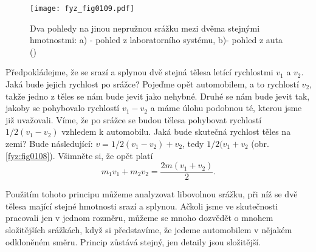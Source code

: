     \begin{figure}[ht!]  %
      \centering
      \texttt{[image: fyz\_fig0109.pdf]}
      \caption{Dva pohledy na jinou nepružnou srážku mezi dvěma stejnými hmotnostmi: a) - pohled z 
               laboratorního systému, b)- pohled z auta
              (\cite[s.~145]{Feynman01})}
      \label{fyz:fig0109}
    \end{figure}
    Předpokládejme, že se srazí a splynou dvě stejná tělesa letící rychlostmi \(v_1\) a \(v_2\). 
    Jaká bude jejich rychlost po srážce? Pojeďme opět automobilem, a to rychlostí \(v_2\), takže 
    jedno z těles se nám bude jevit jako nehybné. Druhé se nám bude jevit tak, jakoby se pohybovalo 
    rychlostí \(v_1 - v_2\) a máme úlohu podobnou té, kterou jsme již uvažovali. Víme, že po srážce 
    se budou tělesa pohybovat rychlostí \(1/2 (v_1 - v_2)\) vzhledem k automobilu. Jaká bude 
    skutečná rychlost těles na zemi? Bude následující: \(v= 1/2(v_1-v_2) + v_2\), tedy \(1/2 (v_1 
    +v_2\) (obr. \ref{fyz:fig0108}). Všimněte si, že opět platí
     \begin{equation}\label{fyz:eq141}
      m_1v_1 + m_2v_2 = \frac{2m(v_1 + v_2)}{2}.
    \end{equation}
    
    Použitím tohoto principu můžeme analyzovat libovolnou srážku, při níž se dvě tělesa mající 
    stejné hmotnosti srazí a splynou. Ačkoli jsme ve skutečnosti pracovali jen v jednom rozměru, 
    můžeme se mnoho dozvědět o mnohem složitějších srážkách, když si představíme, že jedeme 
    automobilem v nějakém odkloněném směru. Princip zůstává stejný, jen detaily jsou složitější.

